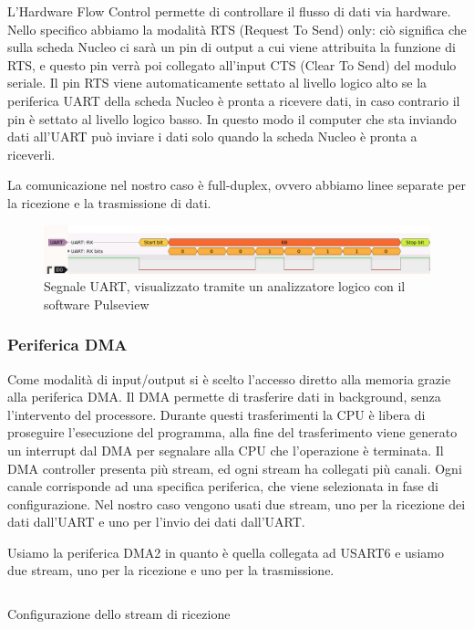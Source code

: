 L'Hardware Flow Control permette di controllare il flusso di dati via hardware. Nello specifico abbiamo la modalità RTS (Request To Send) only: ciò significa che sulla scheda Nucleo ci sarà un pin di output a cui viene attribuita la funzione di RTS, e questo pin verrà poi collegato all'input CTS (Clear To Send) del modulo seriale. Il pin RTS viene automaticamente settato al livello logico alto se la periferica UART della scheda Nucleo è pronta a ricevere dati, in caso contrario il pin è settato al livello logico basso. In questo modo il computer che sta inviando dati all'UART può inviare i dati solo quando la scheda Nucleo è pronta a riceverli.

La comunicazione nel nostro caso è full-duplex, ovvero abbiamo linee separate per la ricezione e la trasmissione di dati.

\begin{figure}[htb]
    \centering
    \includegraphics[width=\textwidth]{images/uart_protocol.png}
    \caption{Segnale UART, visualizzato tramite un analizzatore logico con il software Pulseview}
    \label{fig:uart_protocol}
\end{figure}

\subsubsection{Periferica DMA}
Come modalità di input/output si è scelto l'accesso diretto alla memoria grazie alla periferica DMA.
Il DMA permette di trasferire dati in background, senza l'intervento del processore. Durante questi trasferimenti la CPU è libera di proseguire l'esecuzione del programma, alla fine del trasferimento viene generato un interrupt dal DMA per segnalare alla CPU che l'operazione è terminata.
Il DMA controller presenta più stream, ed ogni stream ha collegati più canali. Ogni canale corrisponde ad una specifica periferica, che viene selezionata in fase di configurazione.
Nel nostro caso vengono usati due stream, uno per la ricezione dei dati dall'UART e uno per l'invio dei dati dall'UART.

Usiamo la periferica DMA2 in quanto è quella collegata ad USART6 e usiamo due stream, uno per la ricezione e uno per la trasmissione.

\begin{listing}[H]
\inputminted[frame=single,framesep=10pt]{c}{codice/dma2_rx_config.c}
\caption{Configurazione dello stream di ricezione}
\label{listing:DMA_rx_config}
\end{listing}

